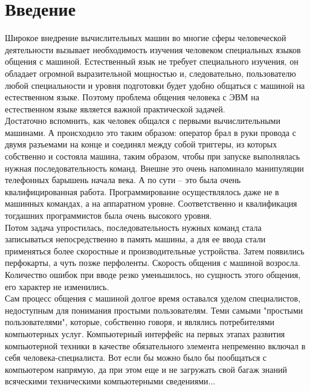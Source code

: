 \chapter{Введение} \label{chapt1}


Широкое внедрение вычислительных машин во многие сферы человеческой деятельности вызывает необходимость изучения человеком специальных языков общения с машиной. Естественный язык не требует специального изучения, он обладает огромной выразительной мощностью и, следовательно, пользователю любой специальности и уровня подготовки будет удобно общаться с машиной на естественном языке. Поэтому проблема общения человека с ЭВМ на естественном языке является важной практической задачей. \\
Достаточно вспомнить, как человек общался с первыми вычислительными машинами. А происходило это таким образом: оператор брал в руки провода с двумя разъемами на конце и соединял между собой триггеры, из которых собственно и состояла машина, таким образом, чтобы при запуске выполнялась нужная последовательность команд. Внешне это очень напоминало манипуляции телефонных барышень начала века. А по сути – это была очень квалифицированная работа. Программирование осуществлялось даже не в машинных командах, а на аппаратном уровне. Соответственно и квалификация тогдашних программистов была очень высокого уровня. \\
Потом задача упростилась, последовательность нужных команд стала записываться непосредственно в память машины, а для ее ввода стали применяться более скоростные и производительные устройства. Затем появились перфокарты, а чуть позже перфоленты. Скорость общения с машиной возросла. Количество ошибок при вводе резко уменьшилось, но сущность этого общения, его характер не изменились. \\
Сам процесс общения с машиной долгое время оставался уделом специалистов, недоступным для понимания простыми пользователям. Теми самыми "простыми пользователями", которые, собственно говоря, и являлись потребителями компьютерных услуг. Компьютерный интерфейс на первых этапах развития компьютерной техники в качестве обязательного элемента непременно включал в себя человека-специалиста. Вот если бы можно было бы пообщаться с компьютером напрямую, да при этом еще и не загружать свой багаж знаний всяческими техническими компьютерными сведениями... \\
